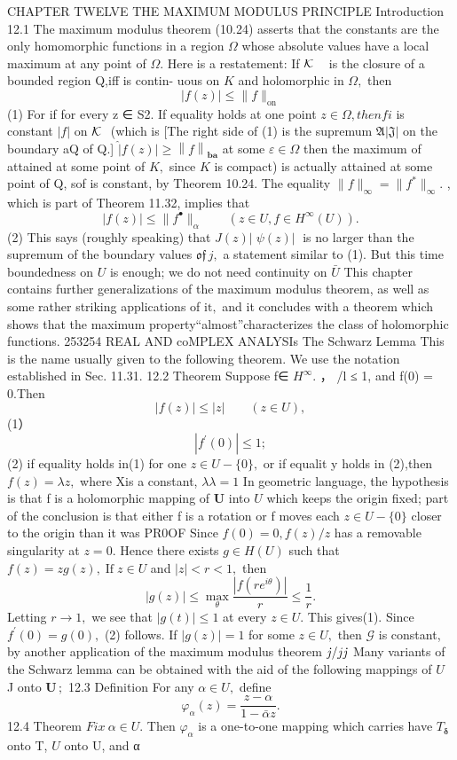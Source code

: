 CHAPTER TWELVE THE MAXIMUM MODULUS PRINCIPLE Introduction 12.1 The maximum modulus theorem (10.24) asserts that the constants are the only homomorphic functions in a region $\Omega$ whose absolute values have a local maximum at any point of $\Omega.$ Here is a restatement: If ${\cal K}\,\,\,\,\,$ is the closure of a bounded region Q,iff is contin- uous on $\textstyle K$ and holomorphic in $\Omega,$ then $$ |f(z)|\leq\|f\|_{\mathrm{on}} $$ (1) For if for every z ∈ S2. If equality holds at one point $z\in\Omega,t h e n f i$ is constant $|f|$ on ${\cal K}\,\,$ (which is [The right side of (1) is the supremum ${\mathfrak{A}}|{\mathfrak{J}}|$ on the boundary aQ of Q.] $\mathbf{\hat{|}}f(z)\mathbf{|}\geq\left\|f\right\|_{\mathbf{b}\mathbf{a}}$ at some $\varepsilon\in\Omega$ then the maximum of attained at some point of $K,$ since $\textstyle K$ is compact) is actually attained at some point of Q, sof is constant, by Theorem 10.24. The equality $\|f\|_{\infty}=\|f^{*}\|_{\infty}.$ , which is part of Theorem 11.32, implies that $$ |f(z)|\leq\|f^{\bullet}\|_{\alpha}\qquad(z\in U,f\in H^{\infty}(U)). $$ (2) This says (roughly speaking) that $\scriptstyle J(z){\big|}\;\psi(z){\big|}\;$ is no larger than the supremum of the boundary values ${\mathfrak{o f}}\,j,$ a statement similar to (1). But this time boundedness on $U$ is enough; we do not need continuity on $\bar{U}$ This chapter contains further generalizations of the maximum modulus theorem, as well as some rather striking applications of ${\mathrm{it}},$ and it concludes with a theorem which shows that the maximum property“almost”characterizes the class of holomorphic functions. 253254 REAL AND coMPLEX ANALYSIs The Schwarz Lemma This is the name usually given to the following theorem. We use the notation established in Sec. 11.31. 12.2 Theorem Suppose f∈ $H^{\infty}.$ ， /l ≤ 1, and f(0) = 0.Then $$ |f(z)|\leq|z|\qquad(z\in U), $$ (1） $$ |f^{\prime}(0)|\leq1; $$ (2) if equality holds in(1) for one $z\in U-\{0\},$ or if equalit y holds in (2),then $f(z)=\lambda z,$ where Xis a constant, $\scriptstyle\lambda\lambda=1$ In geometric language, the hypothesis is that f is a holomorphic mapping of ${\boldsymbol{U}}$ into $U$ which keeps the origin fixed; part of the conclusion is that either f is a rotation or f moves each $z\in U-\{0\}$ closer to the origin than it was PR0OF Since $f(0)=0,f(z)/z$ has a removable singularity at $\scriptstyle z=0.$ Hence there exists $g\in H(U)$ such that $f(z)=z g(z),\operatorname{If}z\in U$ and $|z|<r<1,$ then $$ |g(z)|\leq\operatorname*{max}_{\theta}\frac{|f(r e^{i\theta})|}{r}\leq\frac{1}{r}. $$ Letting $r\to1,$ we see that $|g(t)|\leq1$ at every $z\in U.$ This gives(1). Since $f^{\prime}(0)=g(0),$ (2) follows. If $|g(z)|=1$ for some $z\in U,$ then $\scriptstyle{\mathcal{G}}$ is constant, by another application of the maximum modulus theorem ${\it j}/j{\it j}$ Many variants of the Schwarz lemma can be obtained with the aid of the following mappings of $U$ J onto ${\boldsymbol{U}}\,;$ 12.3 Definition For any $\alpha\in U,$ define $$ \varphi_{\alpha}(z)={\frac{z-\alpha}{1-{\bar{\alpha}}z}}. $$ 12.4 Theorem $F i x\ \alpha\in U.$ Then $\varphi_{\alpha}$ is a one-to-one mapping which carries have $T_{\mathbf{\delta}}$ onto T, $U$ onto U, and α 